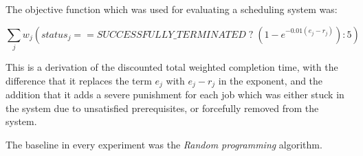 The objective function which was used for evaluating a scheduling system was:

$$ \sum_{j} w_j (status_j == SUCCESSFULLY\_TERMINATED \; ? \; (1 - e^{-0.01 (e_j - r_j)}) : 5) $$

This is a derivation of the discounted total weighted completion time, with the difference that it replaces the term $e_j$ with $e_j - r_j$ in the exponent, and the addition that it adds a severe punishment for each job which was either stuck in the system due to unsatisfied prerequisites, or forcefully removed from the system.

The baseline in every experiment was the \textit{Random programming} algorithm.